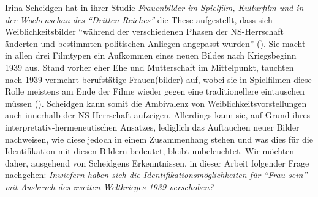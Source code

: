 \documentclass[12pt, titlepage=true, toc=bib]{scrartcl}
\begin{document}
Irina Scheidgen hat in ihrer Studie \textit{Frauenbilder im Spielfilm, Kulturfilm und in der Wochenschau des "`Dritten Reiches"'}  die These aufgestellt, dass sich Weiblichkeitsbilder "`während der verschiedenen Phasen der NS-Herrschaft änderten und bestimmten politischen Anliegen angepasst wurden"' (\cite*[260]{scheidgen_frauenbilder_2015}). Sie macht in allen drei Filmtypen ein Aufkommen eines neuen Bildes nach Kriegsbeginn 1939 aus. Stand vorher eher Ehe und Mutterschaft im Mittelpunkt, tauchten nach 1939 vermehrt berufstätige Frauen(bilder) auf, wobei sie in Spielfilmen diese Rolle meistens am Ende der Filme wieder gegen eine traditionellere eintauschen müssen (\cite[vgl.][278]{scheidgen_frauenbilder_2015}). Scheidgen kann somit die Ambivalenz von Weiblichkeitsvorstellungen auch innerhalb der NS-Herrschaft aufzeigen. Allerdings kann sie, auf Grund ihres interpretativ-hermeneutischen Ansatzes, lediglich das Auftauchen neuer Bilder nachweisen, wie diese jedoch in einem Zusammenhang stehen und was dies für die Identifikation mit diesen Bildern bedeutet, bleibt unbeleuchtet. Wir möchten daher, ausgehend von Scheidgens Erkenntnissen, in dieser Arbeit folgender Frage nachgehen: \textit{Inwiefern haben sich die Identifikationsmöglichkeiten für "`Frau sein"' mit Ausbruch des zweiten Weltkrieges 1939 verschoben?}
\end{document}

